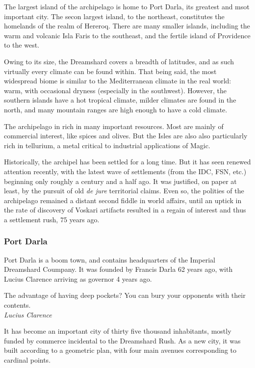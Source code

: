 The largest island of the archipelago is home to Port Darla, its greatest and msot important city. The secon largest island, to the northeast, constitutes the homelands of the realm of Hereroq. There are many smaller islands, including the warm and volcanic Isla Faris to the southeast, and the fertile island of Providence to the west.

Owing to its size, the Dreamshard covers a breadth of latitudes, and as such virtually every climate can be found within. That being said, the most widespread biome is similar to the Mediterranean climate in the real world: warm, with occasional dryness (especially in the southwest). However, the southern islands have a hot tropical climate, milder climates are found in the north, and many mountain ranges are high enough to have a cold climate.

The archipelago in rich in many important resources. Most are mainly of commercial interest, like spices and olives. But the Isles are also also particularly rich in tellurium, a metal critical to industrial applications of Magic.

Historically, the archipel has been settled for a long time. But it has seen renewed attention recently, with the latest wave of settlements (from the IDC, FSN, etc.) beginning only roughly a century and a half ago. It was justified, on paper at least, by the pursuit of old \textit{de jure} territorial claims. Even so, the polities of the archipelago remained a distant second fiddle in world affairs, until an uptick in the rate of discovery of Voskari artifacts resulted in a regain of interest and thus a settlement rush, 75 years ago.



\subsubsection{Port Darla}

Port Darla is a boom town, and contains headquarters of the Imperial Dreamshard Coumpany. It was founded by Francis Darla 62 years ago, with Lucius Clarence arriving as governor 4 years ago. 


\begin{rpg-quotebox}
    The advantage of having deep pockets? You can bury your opponents with their contents. \\ \textendash \textit{Lucius Clarence}
    \end{rpg-quotebox}
 
It has become an important city of thirty five thousand inhabitants, mostly funded by commerce incidental to the Dreamshard Rush. As a new city, it was built according to a geometric plan, with four main avenues corresponding to cardinal points.


